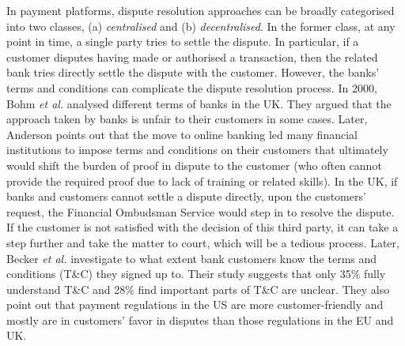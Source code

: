 In payment platforms,  dispute resolution approaches can be broadly categorised into two classes, (a) \emph{centralised} and (b) \emph{decentralised}. In the former class,  at any point in time, a single party tries to settle the dispute. In particular, if a customer  disputes having made or authorised a transaction, then the related bank tries directly settle the dispute with the customer.  However, the banks' terms and conditions can complicate the dispute resolution process. In 2000, Bohm \textit{et al.} \cite{BohmBG00} analysed different terms of banks in the UK. They argued that the approach taken by banks is unfair to their customers in some cases. Later,  Anderson  \cite{anderson2007closing} points out that the move to online banking led many financial institutions to impose terms and conditions on their customers that ultimately would shift the burden of proof in dispute to the customer (who often cannot  provide the required proof due to lack of training or related skills). In the UK, if banks and customers cannot settle a dispute directly, upon the customers' request, the  Financial Ombudsman Service would step in to resolve the dispute. If the customer is  not satisfied with the decision of this third party, it can take a step further and take  the matter to court, which will be  a tedious process. Later,  Becker \textit{et al.} \cite{BeckerHAABMSS17} investigate to what extent bank customers know the terms and conditions (T\&C) they  signed up to. Their study suggests that only 35\% fully understand T\&C and  28\% find important parts of T\&C are unclear. They also point out that  payment regulations in the US are more customer-friendly and mostly are in  customers' favor in disputes than those regulations in the EU and UK. 

